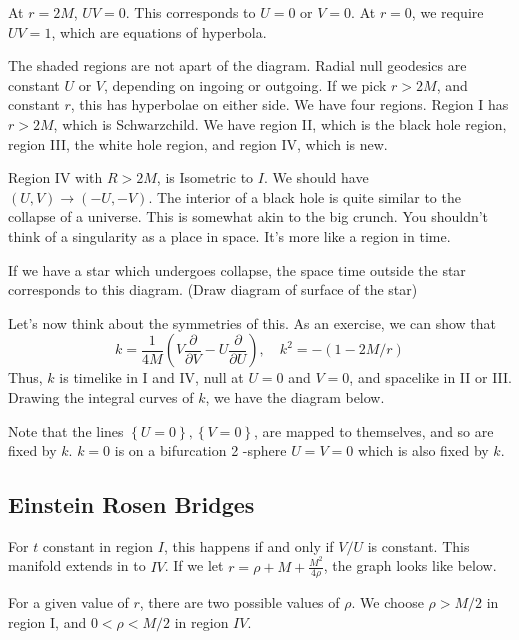 \documentclass[11pt, oneside]{article}   	%
\theoremstyle{slanted}
\begin{document}
At $ r = 2M $, $ U V  = 0 $. 
This corresponds to $ U =  0 $ or $ V = 0 $. 
At  $ r = 0 $, we require $ U V  = 1 $, 
which are equations of hyperbola.

The shaded regions are not apart of the diagram. 
Radial null geodesics are 
constant $ U $ or $ V $, 
depending on ingoing or outgoing. 
If we pick $ r > 2 M $, and constant $ r $, 
this has hyperbolae on either side. 
We have four regions. 
Region I has $ r > 2 M $, 
which is Schwarzchild. We have region II, which is 
the black hole region, 
region III, the white hole region, 
and region IV, which is new. 

Region IV with $ R > 2M $, 
is Isometric to $ I $. 
We should have $ \left( U , V  \right)  \to \left(  - U , - V  \right)  $. 
The interior of a black hole is quite 
similar to the collapse of a universe. 
This is somewhat akin to the big crunch.
You shouldn't think of a singularity as a place in space. 
It's more like a region in time. 

If we have a star which undergoes collapse, 
the space time outside the star corresponds to this diagram. 
(Draw diagram of surface of the star)

Let's 
now think about the symmetries of this. 
As an exercise, 
we can show that 
\[
k  = \frac{1}{4 M } \left( V \frac{\partial  }{\partial  V }   - 
U \frac{\partial  }{\partial  U }   \right) , \quad k ^ 2 =  - 
\left(  1- 2M / r  \right) 
\] Thus, $ k $ is timelike in I and IV, 
null at $ U  = 0  $ and $ V  = 0 $, 
and spacelike in II or III. 
Drawing the integral curves of $ k $, 
we have the diagram below. 

Note that the lines $ \left\{  U = 0  \right\}  , \left\{  V  = 0  \right\}  $, 
are mapped to themselves, 
and so are fixed by $ k $. $ k  = 0 $ 
is on a bifurcation 2 -sphere 
$ U  = V  =0 $ which is also fixed by $ k $.


\subsection{Einstein Rosen Bridges}
For $ t $ constant in region $ I $, 
this happens if and only if $ V /  U $ is constant. 
This manifold extends in to $ I V $. 
If we 
let $ r  = \rho + M + \frac{ M ^ 2  }{4  \rho } $, 
the graph looks like below. 

For a given value of $ r $, there are 
two possible values of $ \rho $. 
We choose $ \rho > M / 2 $ in region I, 
and $ 0 < \rho < M / 2 $ in region $ I V $. 
\end{document}
